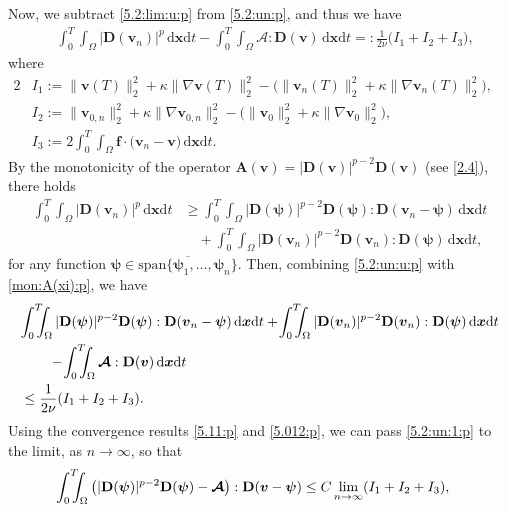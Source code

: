 \documentclass[12pt,reqno]{amsart}
\numberwithin{equation}{section}
\let\originalleft\left
\let\originalright\right
\renewcommand{\left}{\mathopen{}\mathclose\bgroup\originalleft}
\renewcommand{\right}{\aftergroup\egroup\originalright}
\theoremstyle{definition}
\def\dxt{\,\mathrm{d}\boldsymbol{x}\mathrm{d}t}
\def\vv{\boldsymbol{v}}
\def\f{\boldsymbol{f}}
\def\bfD{\mathbf{D}}
\def\bfA{\mathbf{A}}
\def\bmcA{\boldsymbol{\mathcal{A}}}
\def\bpsi{\boldsymbol{\psi}}
\begin{document}
Now, we subtract \eqref{5.2:lim:u:p} from \eqref{5.2:un:p}, and thus we have
\begin{equation}\label{5.2:un:u:p}
\begin{split}
&   \!\int_{0}^{T}\!\!\!\!\int_{\Omega}|\bfD(\vv_n)|^{p}\dxt-\!\int_{0}^{T}\!\!\!\!\int_{\Omega}\bmcA:\bfD(\vv) \dxt =: \frac{1}{2\nu}\big(I_1+I_2+I_3\big),
\end{split}
\end{equation}
where
\begin{alignat*}{2}
& I_1:=  \|\vv(T)\|^2_{2}+\kappa\|\nabla\vv(T)\|_{2}^2-\big(\|\vv_n(T)\|^2_{2}+\kappa\|\nabla\vv_n(T)\|_{2}^2\big), && \\
& I_2:=  \|\vv_{0,n}\|^2_{2}+\kappa\|\nabla\vv_{0,n}\|_{2}^2- \big(\|\vv_0\|^2_{2}+\kappa\|\nabla\vv_0\|_{2}^2\big), && \\
& I_3:= 2\!\int_{0}^{T}\!\!\!\!\int_{\Omega}\f\cdot\big(\vv_n-\vv\big) \dxt.
\end{alignat*}
By the monotonicity of the operator $\bfA(\vv)=|\bfD(\vv)|^{p-2}\bfD(\vv)$ (see \eqref{2.4}), there holds
\begin{equation}\label{mon:A(xi):p}
\begin{split}
 \!\int_{0}^{T}\!\!\!\!\int_{\Omega}|\bfD(\vv_n)|^{p}\dxt& \geq
\!\int_{0}^{T}\!\!\!\!\int_{\Omega}|\bfD(\bpsi)|^{p-2}\bfD(\bpsi):\bfD(\vv_n-\bpsi) \dxt \\&\quad + \!\int_{0}^{T}\!\!\!\!\int_{\Omega}|\bfD(\vv_n)|^{p-2}\bfD(\vv_n):\bfD(\bpsi)\dxt,
\end{split}
\end{equation}
for any function $\bpsi\in\overline{\mathrm{span}\{\bpsi_1,\dots,\bpsi_{n}\}}$.
Then, combining \eqref{5.2:un:u:p} with \eqref{mon:A(xi):p}, we have
\begin{equation}\label{5.2:un:1:p}
\begin{split}
& \!\int_{0}^{T}\!\!\!\!\int_{\Omega}|\bfD(\bpsi)|^{p-2}\bfD(\bpsi):\bfD(\vv_n-\bpsi) \dxt +  \!\int_{0}^{T}\!\!\!\!\int_{\Omega}|\bfD(\vv_n)|^{p-2}\bfD(\vv_n):\bfD(\bpsi)\dxt  \\&\qquad
- \!\int_{0}^{T}\!\!\!\!\int_{\Omega}\bmcA:\bfD(\vv) \dxt\\& \leq \frac{1}{2\nu}\left(I_1+I_2+I_3\right).
\end{split}
\end{equation}
Using the convergence results \eqref{5.11:p} and \eqref{5.012:p}, we can pass \eqref{5.2:un:1:p} to the limit, as $n\to\infty$, so that
\begin{equation}\label{5.2:un:2:p}
\begin{split}
& \!\int_{0}^{T}\!\!\!\!\int_{\Omega}\big(|\bfD(\bpsi)|^{p-2}\bfD(\bpsi)-\bmcA\big):\bfD(\vv-\bpsi)
\leq C\lim_{n\to\infty}\left(I_1+I_2+I_3\right),
\end{split}
\end{equation}
\end{document}
